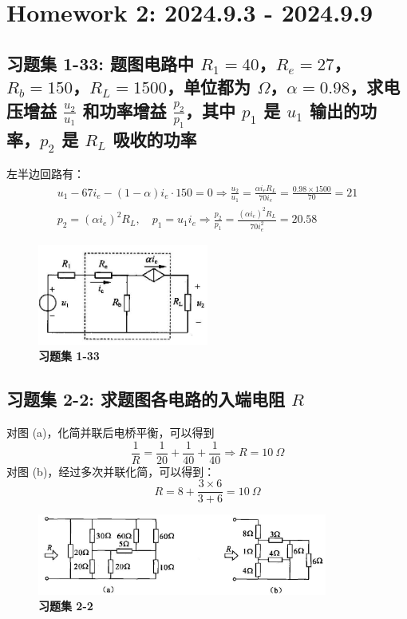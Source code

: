 \documentclass[UTF8]{report}
\theoremstyle{MyLineTheoremStyle} %
\theoremstyle{MyBlockTheoremStyle} %
\theoremstyle{MySubsubsectionStyle} %
\begin{document}
\chapter{Homework 2: 2024.9.3 - 2024.9.9}
\thispagestyle{fancy}

\section{习题集 1-33: 题图电路中 $R_1 = 40$，$R_e = 27$，$R_b = 150$，$R_L = 1500$，单位都为 $\Omega$，$\alpha = 0.98$，求电压增益 $\frac{u_2}{u_1}$ 和功率增益 $\frac{p_2}{p_1}$，其中 $p_1$ 是 $u_1$ 输出的功率，$p_2$ 是 $R_L$ 吸收的功率}
左半边回路有：
\begin{gather*}
u_1 - 67i_e - (1-\alpha)i_e \cdot 150 = 0 \Longrightarrow \frac{u_2}{u_1} = \frac{\alpha i_eR_L }{70i_e} = \frac{0.98\times 1500}{70} = 21 \\ 
p_2 = (\alpha i_e)^2R_L, \quad p_1 = u_1 i_e \Longrightarrow \frac{p_2}{p_1} = \frac{(\alpha i_e)^2R_L}{70i_e^2} = 20.58
\end{gather*}

\begin{figure}[H]\centering
\includegraphics[width=0.5\textwidth]{assets/2/image (47).jpg}
\caption{\textbf{习题集 1-33}}
\end{figure}


\section{习题集 2-2: 求题图各电路的入端电阻 $R$}
对图 (a)，化简并联后电桥平衡，可以得到
\begin{equation*}
\frac{1}{R} = \frac{1}{20 } + \frac{1}{40} +\frac{1}{40} \Longrightarrow R = 10\ \Omega
\end{equation*}
对图 (b)，经过多次并联化简，可以得到：
\begin{equation}
R = 8 + \frac{3\times 6}{3+6}=10\ \Omega
\end{equation}
\begin{figure}[H]\centering
\includegraphics[width=0.85\textwidth]{assets/2/e02c39d3f229a4b6352b828e57c3737f.jpg}
\caption{\textbf{习题集 2-2}}
\end{figure}
\end{document}
